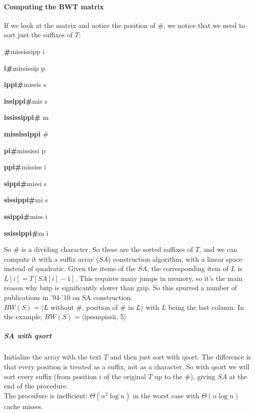 \documentclass[10pt]{report}
\begin{document}
\paragraph{Computing the BWT matrix} If we look at the matrix and notice the position of \#, we notice that we need to sort just the suffixes of $T$: \begin{list}{}{}
	\item \textbf{\#}mississipp i
	\item \textbf{i\#}mississip p
	\item \textbf{ippi\#}missis s
	\item \textbf{issippi\#}mis s
	\item \textbf{ississippi\#} m
	\item \textbf{mississippi} \#
	\item \textbf{pi\#}mississi p
	\item \textbf{ppi\#}mississ i
	\item \textbf{sippi\#}missi s
	\item \textbf{sissippi\#}mi s
	\item \textbf{ssippi\#}miss i
	\item \textbf{ssissippi\#}m i
\end{list}
So \# is a dividing character. So these are the sorted suffixes of $T$, and we can compute it with a suffix array ($SA$) construction algorithm, with a linear space instead of quadratic. Given the items of the $SA$, the corresponding item of $L$ is $L[i] = T[SA[i]-1]$. This requires many jumps in memory, so it's the main reason why bzip is significantly slower than gzip. So this spurred a number of publications in '94-'10 on SA construction.\\
$BW(S) = \langle L$ without $\#$, position of $\#$ in $L\rangle$ with $L$ being the last column. In the example, $BW(S) = \langle$ipssmpissii, 5$\rangle$
\subparagraph{SA with qsort} Initialize the array with the text $T$ and then just sort with qsort. The difference is that every position is treated as a suffix, not as a character. So with qsort we will sort every suffix (from position $i$ of the original $T$ up to the \#), giving $SA$ at the end of the procedure.\\
The procedure is inefficient: $\Theta(n^2\log n)$ in the worst case with $\Theta(n\log n)$ cache misses.
\end{document}
